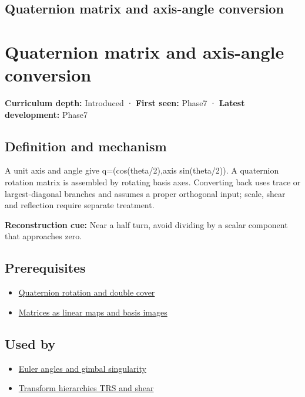 \hypertarget{appendix-26d8da71f6c4}{}
\section*{Quaternion matrix and axis-angle conversion}
\chapter{Quaternion matrix and axis-angle conversion}\label{appendix-26d8da71f6c4-quaternion-matrix-and-axis-angle-conversion}

\textbf{Curriculum depth:} Introduced · \textbf{First seen:} Phase7 · \textbf{Latest development:} Phase7

\section{Definition and mechanism}\label{appendix-26d8da71f6c4-definition-and-mechanism}

A unit axis and angle give q=(cos(theta/2),axis sin(theta/2)). A quaternion rotation matrix is assembled by rotating basis axes. Converting back uses trace or largest-diagonal branches and assumes a proper orthogonal input; scale, shear and reflection require separate treatment.

\textbf{Reconstruction cue:} Near a half turn, avoid dividing by a scalar component that approaches zero.

\section{Prerequisites}\label{appendix-26d8da71f6c4-prerequisites}

\begin{itemize}
\tightlist
\item
  \hyperref[appendix-8e61ab68f6b2]{Quaternion rotation and double cover}
\item
  \hyperref[appendix-bd39c3bf5d64]{Matrices as linear maps and basis images}
\end{itemize}

\section{Used by}\label{appendix-26d8da71f6c4-used-by}

\begin{itemize}
\tightlist
\item
  \hyperref[appendix-5f723fbd0593]{Euler angles and gimbal singularity}
\item
  \hyperref[appendix-292c061cd47c]{Transform hierarchies TRS and shear}
\end{itemize}

